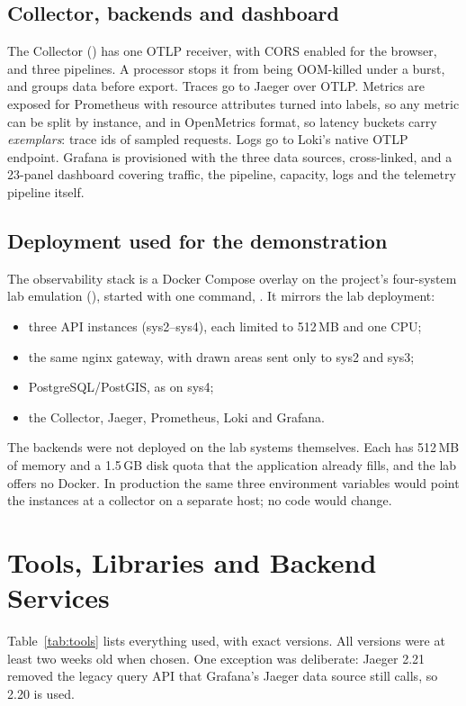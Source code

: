 \documentclass[11pt,a4paper]{article}
\begin{document}
\subsection{Collector, backends and dashboard}
The Collector () has one OTLP receiver, with CORS
enabled for the browser, and three pipelines. A  processor stops it from
being OOM-killed under a burst, and  groups data before export. Traces go to Jaeger
over OTLP. Metrics are exposed for Prometheus with resource attributes turned into labels, so any
metric can be split by instance, and in OpenMetrics format, so latency buckets carry
\emph{exemplars}: trace ids of sampled requests. Logs go to Loki's native OTLP endpoint. Grafana
is provisioned with the three data sources, cross-linked, and a 23-panel dashboard covering
traffic, the pipeline, capacity, logs and the telemetry pipeline itself.

\subsection{Deployment used for the demonstration}
The observability stack is a Docker Compose overlay on the project's four-system lab emulation
(), started with one command, . It mirrors
the lab deployment:
\begin{itemize}
  \item three API instances (sys2--sys4), each limited to 512\,MB and one CPU;
  \item the same nginx gateway, with drawn areas sent only to sys2 and sys3;
  \item PostgreSQL/PostGIS, as on sys4;
  \item the Collector, Jaeger, Prometheus, Loki and Grafana.
\end{itemize}
The backends were not deployed on the lab systems themselves. Each has 512\,MB of memory and a
1.5\,GB disk quota that the application already fills, and the lab offers no Docker. In
production the same three environment variables would point the instances at a collector on a
separate host; no code would change.

\section{Tools, Libraries and Backend Services}
\label{sec:tools}
Table~\ref{tab:tools} lists everything used, with exact versions. All versions were at least two
weeks old when chosen. One exception was deliberate: Jaeger 2.21 removed the legacy query API
that Grafana's Jaeger data source still calls, so 2.20 is used.
\end{document}
